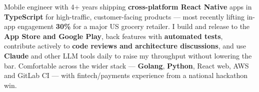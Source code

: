 
\begin{cvparagraph}
Mobile engineer with 4+ years shipping \textbf{cross-platform React Native} apps in \textbf{TypeScript} for high-traffic, customer-facing products --- most recently lifting in-app engagement \textbf{30\%} for a major US grocery retailer. I build and release to the \textbf{App Store and Google Play}, back features with \textbf{automated tests}, contribute actively to \textbf{code reviews and architecture discussions}, and use \textbf{Claude} and other LLM tools daily to raise my throughput without lowering the bar. Comfortable across the wider stack --- \textbf{Golang}, \textbf{Python}, React web, AWS and GitLab CI --- with fintech/payments experience from a national hackathon win.
\end{cvparagraph}
